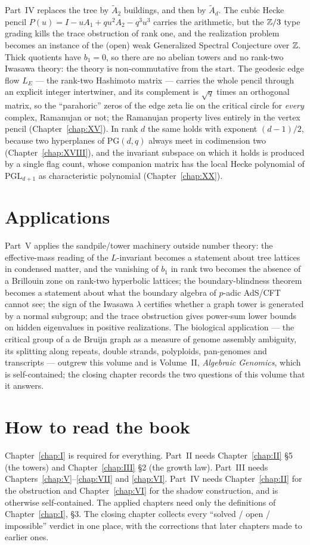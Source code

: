 Part~IV replaces the tree by $\widetilde A_2$ buildings, and then by $\widetilde A_d$. The
cubic Hecke pencil $P(u)=I-uA_1+qu^2A_2-q^3u^3$ carries the arithmetic, but the $\mathbb{Z}/3$
type grading kills the trace obstruction of rank one, and the realization problem becomes
an instance of the (open) weak Generalized Spectral Conjecture over $\mathbb{Z}$. Thick quotients
have $b_1=0$, so there are no abelian towers and no rank-two Iwasawa theory: the theory is
non-commutative from the start. The geodesic edge flow $L_E$ --- the rank-two Hashimoto
matrix --- carries the whole pencil through an explicit integer intertwiner, and its
complement is $\sqrt q$ times an orthogonal matrix, so the ``parahoric'' zeros of the edge
zeta lie on the critical circle for \emph{every} complex, Ramanujan or not; the Ramanujan
property lives entirely in the vertex pencil (Chapter~\ref{chap:XV}). In rank $d$ the same
holds with exponent $(d-1)/2$, because two hyperplanes of $\mathrm{PG}(d,q)$ always meet in
codimension two (Chapter~\ref{chap:XVIII}), and the invariant subspace on which it holds is
produced by a single flag count, whose companion matrix has the local Hecke polynomial of
$\mathrm{PGL}_{d+1}$ as characteristic polynomial (Chapter~\ref{chap:XX}).

\section{Applications}

Part~V applies the sandpile/tower machinery outside number theory: the effective-mass
reading of the $L$-invariant becomes a statement about tree lattices in condensed
matter, and the vanishing of $b_1$ in rank two becomes the absence of a Brillouin zone on
rank-two hyperbolic lattices; the boundary-blindness theorem becomes a statement about
what the boundary algebra of $p$-adic AdS/CFT cannot see; the sign of the Iwasawa
$\lambda$ certifies whether a graph tower is generated by a normal subgroup; and the trace
obstruction gives power-sum lower bounds on hidden eigenvalues in positive realizations.
The biological application --- the critical group of a de Bruijn graph as a measure of
genome assembly ambiguity, its splitting along repeats, double strands, polyploids,
pan-genomes and transcripts --- outgrew this volume and is Volume~II,
\emph{Algebraic Genomics}, which is self-contained; the closing chapter records the two
questions of this volume that it answers.

\section{How to read the book}

Chapter~\ref{chap:I} is required for everything. Part~II needs Chapter~\ref{chap:II}
\S5 (the towers) and Chapter~\ref{chap:III} \S2 (the growth law). Part~III needs
Chapters~\ref{chap:V}--\ref{chap:VII} and \ref{chap:VI}. Part~IV needs
Chapter~\ref{chap:II} for the obstruction and Chapter~\ref{chap:VI} for the shadow
construction, and is otherwise self-contained. The applied chapters need only the
definitions of Chapter~\ref{chap:I}, \S3. The closing chapter collects every ``solved /
open / impossible'' verdict in one place, with the corrections that later chapters made
to earlier ones.
